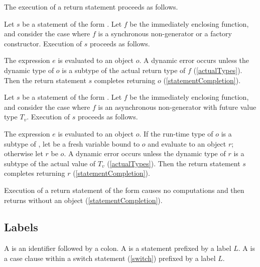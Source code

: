 \documentclass[makeidx]{article}
\begin{document}
\LMHash{}%
The execution of a return statement proceeds as follows.

\LMHash{}%
Let $s$ be a statement of the form .
%
Let $f$ be the immediately enclosing function,
and consider the case where $f$ is a synchronous non-generator
or a factory constructor.
Execution of $s$ proceeds as follows.

\LMHash{}%
The expression $e$ is evaluated to an object $o$.
A dynamic error occurs unless the dynamic type of $o$ is a subtype of
the actual return type of $f$
(\ref{actualTypes}).
Then the return statement $s$ completes returning $o$
(\ref{statementCompletion}).

\EndCase

\LMHash{}%
Let $s$ be a statement of the form .
%
Let $f$ be the immediately enclosing function,
and consider the case where $f$ is an asynchronous non-generator
with future value type $T_v$.
Execution of $s$ proceeds as follows.

\LMHash{}%
The expression $e$ is evaluated to an object $o$.
If the run-time type of $o$ is a subtype of ,
let  be a fresh variable bound to $o$ and
evaluate  to an object $r$;
otherwise let $r$ be $o$.
A dynamic error occurs unless the dynamic type of $r$
is a subtype of the actual value of $T_v$
(\ref{actualTypes}).
Then the return statement $s$ completes returning $r$
(\ref{statementCompletion}).
\EndCase


\LMHash{}%
Execution of a return statement of the form \code{\RETURN;}
causes no computations and then returns without an object
(\ref{statementCompletion}).


\subsection{Labels}

\LMHash{}%
A  is an identifier followed by a colon.
A  is a statement prefixed by a label $L$.
A  is a case clause within a switch statement
(\ref{switch})
prefixed by a label $L$.
\end{document}
